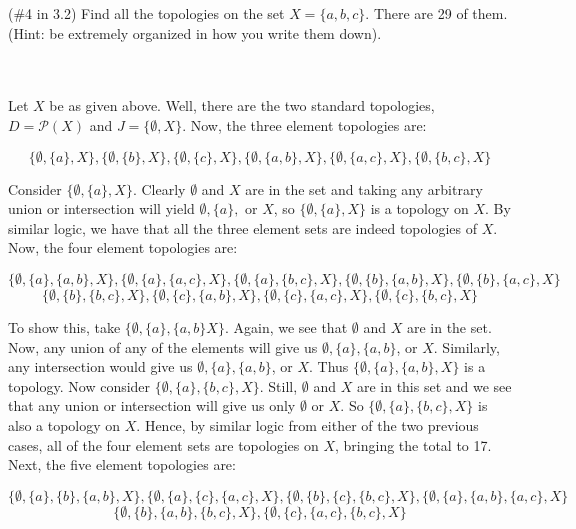 (\#4 in 3.2) Find all the topologies on the set $X = \{a,b,c\}$. There are 29 of them. (Hint: be
extremely organized in how you write them down).\\\\

\begin{solution}\renewcommand{\qedsymbol}{}\ \\
    Let $X$ be as given above. Well, there are the two standard topologies, $D=\mathcal{P}(X)$ and
    $J=\{\emptyset, X\}$. Now, the three element topologies are:
    
    $$\{\emptyset, \{a\}, X\}, \{\emptyset, \{b\}, X\}, \{\emptyset, \{c\}, X\},
    \{\emptyset, \{a,b\}, X\},\{\emptyset, \{a,c\}, X\}, \{\emptyset, \{b,c\}, X\}$$
    
    Consider $\{\emptyset, \{a\}, X\}$. Clearly $\emptyset$ and $X$ are in the set and taking any
    arbitrary union or intersection will yield $\emptyset, \{a\},$ or $X$, so $\{\emptyset, \{a\}, X\}$
    is a topology on $X$. By similar logic, we have that all the three element sets are indeed
    topologies of $X$. Now, the four element topologies are:
    
    $$\{\emptyset, \{a\}, \{a,b\}, X\}, \{\emptyset, \{a\}, \{a,c\}, X\},
    \{\emptyset, \{a\}, \{b,c\}, X\}, \{\emptyset, \{b\}, \{a,b\}, X\},
    \{\emptyset, \{b\}, \{a,c\}, X\}$$
    $$\{\emptyset, \{b\}, \{b,c\}, X\}, \{\emptyset, \{c\}, \{a,b\}, X\},
    \{\emptyset, \{c\}, \{a,c\}, X\}, \{\emptyset, \{c\}, \{b,c\}, X\}$$
    
    To show this, take $\{\emptyset, \{a\}, \{a,b\} X\}$. Again, we see that $\emptyset$ and $X$ are in
    the set. Now, any union of any of the elements will give us $\emptyset, \{a\}, \{a,b\}$, or $X$.
    Similarly, any intersection would give us $\emptyset, \{a\}, \{a,b\}$, or $X$. Thus
    $\{\emptyset, \{a\}, \{a,b\}, X\}$ is a topology. Now consider $\{\emptyset, \{a\}, \{b,c\}, X\}$.
    Still, $\emptyset$ and $X$ are in this set and we see that any union or intersection will give us
    only $\emptyset$ or $X$. So $\{\emptyset, \{a\}, \{b,c\}, X\}$ is also a topology on $X$. Hence, by
    similar logic from either of the two previous cases, all of the four element sets are topologies on
    $X$, bringing the total to 17. Next, the five element topologies are:
    
    $$\{\emptyset, \{a\}, \{b\}, \{a,b\}, X\}, \{\emptyset, \{a\}, \{c\}, \{a,c\}, X\},
    \{\emptyset, \{b\}, \{c\}, \{b,c\}, X\}, \{\emptyset, \{a\}, \{a,b\}, \{a,c\}, X\}$$
    $$\{\emptyset, \{b\}, \{a,b\}, \{b,c\}, X\}, \{\emptyset, \{c\}, \{a,c\}, \{b,c\}, X\}$$
    

\end{solution}
